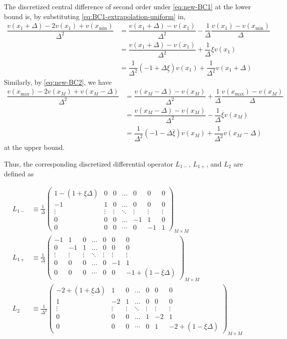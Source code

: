 \documentclass[11pt]{article}
\theoremstyle{definition}
\begin{document}
The discretized central difference of second order under \eqref{eq:new-BC1} at the lower bound is, by substituting \eqref{eq:BC1-extrapolation-uniform} in,
\begin{align}
\dfrac{v ({x_{1}} + \Delta) - 2 v({x_{1}}) + v(x_{\min})}{\Delta^2} &=   \dfrac{v({x_{1}} + \Delta) - v({x_{1}})}{\Delta^2} - \dfrac{1}{\Delta}\dfrac{v ({x_{1}}) - v(x_{\min}) }{\Delta}  \\
&= \dfrac{v({x_{1}} + \Delta) - v({x_{1}})}{\Delta^2} + \dfrac{1}{\Delta} \underline{\xi} v({x_{1}})  \\
&= \dfrac{1}{\Delta^2}  (- 1 + \Delta \underline{\xi}) v({x_{1}})  + \dfrac{1}{\Delta^2}  v({x_{1}} + \Delta)
\end{align}
Similarly, by \eqref{eq:new-BC2}, we have
\begin{align}
\dfrac{v(x_{\max}) - 2 v({x_{M}} ) + v({x_{M}} -\Delta)}{\Delta^2} &=   \dfrac{v({x_{M}} - \Delta) - v({x_{M}})}{\Delta^2} + \dfrac{1}{\Delta}\dfrac{ v(x_{\max}) - v ({x_{M}}) }{\Delta}  \\
&= \dfrac{v({x_{M}} - \Delta) - v({x_{M}})}{\Delta^2}  - \dfrac{1}{\Delta} \overline{\xi} v({x_{M}})  \\
&= \dfrac{1}{\Delta^2}  (- 1 - \Delta \overline{\xi}) v({x_{M}})  + \dfrac{1}{\Delta^2}  v({x_{M}} - \Delta)
\end{align}
at the upper bound.

Thus, the corresponding discretized differential operator $L_{1-}$, $L_{1+}$, and $L_2$ are defined as

\begin{align}
L_{1-} &\equiv \frac{1}{\Delta}\begin{pmatrix}
1 - (1 + \underline{\xi} \Delta) &0&0&\dots&0&0&0\\
-1&1&0&\dots&0&0&0\\
\vdots&\vdots&\vdots&\ddots&\vdots&\vdots&\vdots\\
0&0&0&\dots&-1&1&0\\
0&0&0&\cdots&0&-1&1
\end{pmatrix}_{M\times M}\label{eq:L-1-regular} \\
L_{1+} &\equiv \frac{1}{\Delta}\begin{pmatrix}
-1&1&0&\dots&0&0&0\\
0&-1&1&\dots&0&0&0\\
\vdots&\vdots&\vdots&\ddots&\vdots&\vdots&\vdots\\
0&0&0&\dots&0&-1&1\\
0&0&0&\cdots&0&0&-1+(1-\overline{\xi} \Delta)
\end{pmatrix}_{M\times M}\label{eq:L-1-plus-regular} \\
L_2 &\equiv \frac{1}{\Delta^2}\begin{pmatrix}
-2 + (1 + \underline{\xi}\Delta) &1&0&\dots&0&0&0\\
1&-2&1&\dots&0&0&0\\
\vdots&\vdots&\vdots&\ddots&\vdots&\vdots&\vdots\\
0&0&0&\dots&1&-2&1\\
0&0&0&\cdots&0&1&-2 + (1- \overline{\xi}\Delta)
\end{pmatrix}_{M\times M}\label{eq:L-2-regular}
\end{align}
\end{document}
